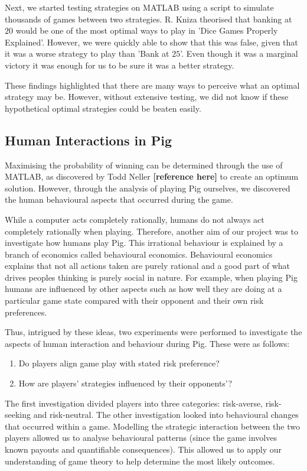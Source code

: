 \documentclass[a4paper,titlepage]{article}
\begin{document}
Next, we started testing strategies on MATLAB using a script to simulate thousands of games between two strategies. R. Kniza theorised that banking at $20$ would be one of the most optimal ways to play in 'Dice Games Properly Explained'. However, we were quickly able to show that this was false, given that it was a worse strategy to play than 'Bank at $25$'. Even though it was a marginal victory it was enough for us to be sure it was a better strategy.

These findings highlighted that there are many ways to perceive what an optimal strategy may be. However, without extensive testing, we did not know if these hypothetical optimal strategies could be beaten easily.
\subsection{Human Interactions in Pig}
Maximising the probability of winning can be determined through the use of MATLAB, as discovered by Todd Neller \textbf{[reference here]} to create an optimum solution. However, through the analysis of playing Pig ourselves, we discovered the human behavioural aspects that occurred during the game.

While a computer acts completely rationally, humans do not always act completely rationally when playing. Therefore, another aim of our project was to investigate how humans play Pig. This irrational behaviour is explained by a branch of economics called behavioural economics. Behavioural economics explains that not all actions taken are purely rational and a good part of what drives peoples thinking is purely social in nature. For example, when playing Pig humans are influenced by other aspects such as how well they are doing at a particular game state compared with their opponent and their own risk preferences.

Thus, intrigued by these ideas, two experiments were performed to investigate the aspects of human interaction and behaviour during Pig. These were as follows:
\begin{enumerate}
\item Do players align game play with stated risk preference?
\item How are players' strategies influenced by their opponents'?
\end{enumerate}
The first investigation divided players into three categories: risk-averse, risk-seeking and risk-neutral. The other investigation looked into behavioural changes that occurred within a game. Modelling the strategic interaction between the two players allowed us to analyse behavioural patterns (since the game involves known payouts and quantifiable consequences). This allowed us to apply our understanding of game theory to help determine the most likely outcomes.
\end{document}
